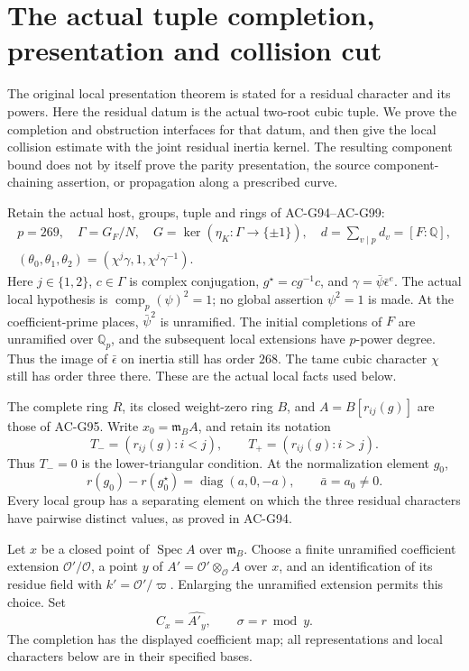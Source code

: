\section{The actual tuple completion, presentation and collision cut}
\label{sec:cubic-tuple-local-presentation}

The original local presentation theorem is stated for a residual
character and its powers.  Here the residual datum is the actual
two-root cubic tuple.  We prove the completion and obstruction
interfaces for that datum, and then give the local collision estimate
with the joint residual inertia kernel.  The resulting component
bound does not by itself prove the parity presentation, the source
component-chaining assertion, or propagation along a prescribed curve.

Retain the actual host, groups, tuple and rings of AC-G94--AC-G99:
\[
 \begin{gathered}
 p=269,\quad \Gamma=G_F/N,\quad
 G=\ker(\eta_K:\Gamma\longrightarrow\{\pm1\}),\quad
 d=\sum_{v\mid p}d_v=[F:\mathbb Q],\\
 (\theta_0,\theta_1,\theta_2)
       =(\chi^j\gamma,1,\chi^j\gamma^{-1}).
 \end{gathered}
 \tag{G101.1}
\]
Here \(j\in\{1,2\}\), \(c\in\Gamma\) is complex conjugation,
\(g^\star=cg^{-1}c\), and
\(\gamma=\bar\psi\bar\epsilon^e\).
The actual local hypothesis is
\(\operatorname{comp}_p(\psi)^2=1\); no global assertion
\(\psi^2=1\) is made.  At the coefficient-prime places,
\(\bar\psi^2\) is unramified.  The initial completions of \(F\)
are unramified over \(\mathbb Q_p\), and the subsequent local
extensions have \(p\)-power degree.  Thus the image of
\(\bar\epsilon\) on inertia still has order \(268\).
The tame cubic character \(\chi\) still has order three there.
These are the actual local facts used below.

The complete ring \(R\), its closed weight-zero ring \(B\), and
\(A=B[r_{ij}(g)]\) are those of AC-G95.
Write \(x_0=\mathfrak m_BA\), and retain its notation
\[
 T_-=(r_{ij}(g):i<j),\qquad T_+=(r_{ij}(g):i>j).
 \tag{G101.2}
\]
Thus \(T_-=0\) is the lower-triangular condition.
At the normalization element \(g_0\),
\[
 r(g_0)-r(g_0^\star)=\operatorname{diag}(a,0,-a),
 \qquad \bar a=a_0\ne0.
 \tag{G101.3}
\]
Every local group has a separating element on which the three
residual characters have pairwise distinct values, as proved
in AC-G94.

Let \(x\) be a closed point of \(\operatorname{Spec}A\) over
\(\mathfrak m_B\).  Choose a finite unramified coefficient
extension \(\mathcal O'/\mathcal O\), a point \(y\) of
\(A'=\mathcal O'\otimes_{\mathcal O}A\) over \(x\), and an
identification of its residue field with \(k'=\mathcal O'/\varpi\).
Enlarging the unramified extension permits this choice.
Set
\[
                  C_x=\widehat{A'_y},\qquad
                  \sigma=r\bmod y .
 \tag{G101.4}
\]
The completion has the displayed coefficient map; all representations
and local characters below are in their specified bases.

